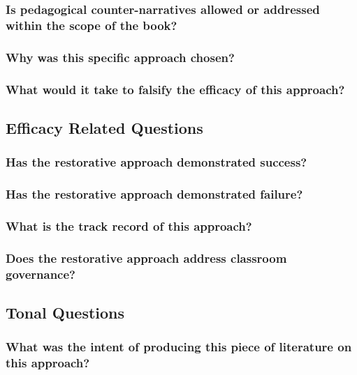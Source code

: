 \documentclass[12pt]{article}
\begin{document}
	\subsubsection{Is pedagogical counter-narratives allowed or addressed within the scope of the book?}
	\subsubsection{Why was this specific approach chosen?}
	\subsubsection{What would it take to falsify the efficacy of this approach?}
	\subsection{Efficacy Related Questions}
	\subsubsection{Has the restorative approach demonstrated success?}
	\subsubsection{Has the restorative approach demonstrated failure?}
	\subsubsection{What is the track record of this approach?}
	\subsubsection{Does the restorative approach address classroom governance?}
	\subsection{Tonal Questions}
	\subsubsection{What was the intent of producing this piece of literature on this approach?}
\end{document}
